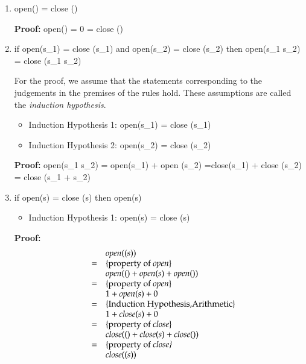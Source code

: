 \documentclass{book}
\begin{document}
\begin{enumerate}
\item   \<open({\epsilon}) = close (\epsilon)\>

  \textbf{Proof:}   \<open({\epsilon}) = 0 = close (\epsilon)\>

\item if \<open({s_1}) = close (s_1)\> and \<open({s_2}) = close (s_2)\> then 
  \<open({s_1 s_2}) = close (s_1 s_2)\>

  For the proof, we assume that the statements corresponding to the judgements
  in the premises of the rules hold. These assumptions are called the
  \emph{induction hypothesis}. 

  \begin{itemize}
    \item Induction Hypothesis 1:  \<open({s_1}) = close (s_1)\>

    \item Induction Hypothesis 2:   \<open({s_2}) = close (s_2)\>
  \end{itemize}
  
  \textbf{Proof:} \<open({s_1 s_2}) = open(s_1) + open (s_2) =close(s_1) +
  close (s_2) = close (s_1 + s_2)\>
  
\item if \<open({s}) = close (s)\> then \<open(\mathtt{(}s\mathtt{)})\> 
  \begin{itemize}
  \item Induction Hypothesis 1:  \<open({s}) = close (s)\>
  \end{itemize}
    
  \textbf{Proof:} 
\begin{displaymath}
\begin{array}{lcl}
	&& open(\mathtt{(}s\mathtt{)}) \\
	&=& \text{\{property of \textit{open}\}}\\
   && open(\mathtt{(}) + open(s) +open(\mathtt{)})\\
	&=& \text{\{property of \textit{open}\}}\\
&& 1  + open (s) + 0  \\
		&=& \text{\{Induction Hypothesis,Arithmetic\}}\\
		 && 1  + close (s) + 0 \\
		&=& \text{\{property of \textit{close}\}}\\
	   && close(\mathtt{(}) + close(s) + close(\mathtt{)})\\
				&=& \text{\{property of \textit{close\}}}\\
					&& close(\mathtt{(}s\mathtt{)}) 
\end{array}
\end{displaymath}

\end{enumerate}
\end{document}
